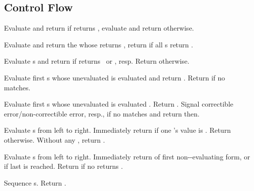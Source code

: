 \subsection{Control Flow}
\begin{LIST}{1cm}

   Evaluate and return
   if  returns \T, evaluate and return
   otherwise.

  Evaluate and return the
   whose  returns \T, return
  \retval{\NIL} if all s return \NIL.

  Evaluate s and return  if
   returns \T\ or \NIL, resp. Return \retval{\NIL} otherwise.

  Evaluate first s whose unevaluated  is
   evaluated  and return .
  Return  if no  matches. 

  Evaluate first s whose unevaluated  is  evaluated
  . Return . Signal correctible error/non-correctible error,
  resp., if no  matches and return \retval{\NIL} then.

  Evaluate s from left to
  right. Immediately return \retval{\NIL} if one 's value is \NIL. Return
   otherwise. Without any ,
  return \retval{\NIL}.

  Evaluate s from left to
  right. Immediately return  of first
  non-\NIL-evaluating form, or  if last 
  is reached. Return \retval{\NIL} if no  returns \T.

   Sequence s. Return
  .


\end{LIST}
